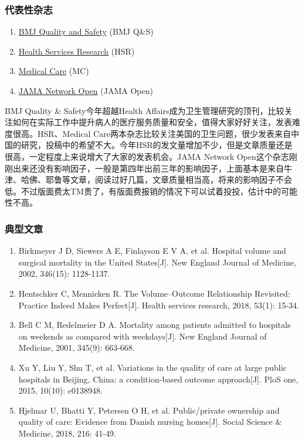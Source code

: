 \documentclass[11pt, a4paper]{article}
\begin{document}
\subsubsection{代表性杂志}
\begin{enumerate}[(1)]
	\item \href{http://qualitysafety.bmj.com/}{BMJ Quality and Safety} (BMJ Q\&S)
	\item \href{https://onlinelibrary.wiley.com/journal/14756773}{Health Services Research} (HSR)
	\item \href{https://journals.lww.com/lww-medicalcare/Pages/default.aspx}{Medical Care} (MC)
	\item \href{https://archpedi.jamanetwork.com/journals/jamanetworkopen}{JAMA Network Open} (JAMA Open)
\end{enumerate}

BMJ Quality \& Safety今年超越Health Affairs成为卫生管理研究的顶刊，比较关注如何在实际工作中提升病人的医疗服务质量和安全，值得大家好好关注，发表难度很高。HSR、Medical Care两本杂志比较关注美国的卫生问题，很少发表来自中国的研究，投稿中的希望不大。今年HSR的发文量增加不少，但是文章质量还是很高，一定程度上来说增大了大家的发表机会。JAMA Network Open这个杂志刚刚出来还没有影响因子，一般是第四年出前三年的影响因子，上面基本是来自牛津、哈佛、耶鲁等文章，阅读过好几篇，文章质量相当高，将来的影响因子不会低。不过版面费太TM贵了，有版面费报销的情况下可以试着投投，估计中的可能性不高。

\subsubsection{典型文章}
\begin{enumerate}[(1)]
	\item Birkmeyer J D, Siewers A E, Finlayson E V A, et al. Hospital volume and surgical mortality in the United States[J]. New England Journal of Medicine, 2002, 346(15): 1128-1137.
	\item Hentschker C, Mennicken R. The Volume–Outcome Relationship Revisited: Practice Indeed Makes Perfect[J]. Health services research, 2018, 53(1): 15-34.
	\item Bell C M, Redelmeier D A. Mortality among patients admitted to hospitals on weekends as compared with weekdays[J]. New England Journal of Medicine, 2001, 345(9): 663-668.
	\item Xu Y, Liu Y, Shu T, et al. Variations in the quality of care at large public hospitals in Beijing, China: a condition-based outcome approach[J]. PloS one, 2015, 10(10): e0138948.
	\item Hjelmar U, Bhatti Y, Petersen O H, et al. Public/private ownership and quality of care: Evidence from Danish nursing homes[J]. Social Science \& Medicine, 2018, 216: 41-49.
\end{enumerate}
\end{document}
